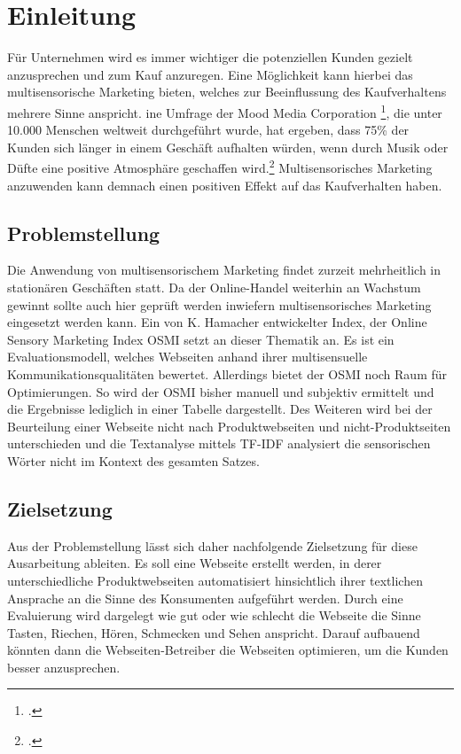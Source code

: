 \section{Einleitung}
Für Unternehmen wird es immer wichtiger die potenziellen Kunden gezielt anzusprechen und zum Kauf anzuregen. Eine Möglichkeit kann hierbei das multisensorische Marketing bieten, welches zur Beeinflussung des Kaufverhaltens mehrere Sinne anspricht.
ine Umfrage der Mood Media Corporation \footcite[\vglf][]{steiner2022}, die unter 10.000 Menschen weltweit durchgeführt wurde, hat ergeben, dass 75\% der Kunden sich länger in einem Geschäft aufhalten würden, wenn durch Musik oder Düfte eine positive Atmosphäre geschaffen wird.\footcite[\vglf][]{moodmedia2019}
Multisensorisches Marketing anzuwenden kann demnach einen positiven Effekt auf das Kaufverhalten haben.

\subsection{Problemstellung}
Die Anwendung von multisensorischem Marketing findet zurzeit mehrheitlich in stationären Geschäften statt. Da der Online-Handel weiterhin an Wachstum gewinnt sollte auch hier geprüft werden inwiefern multisensorisches Marketing eingesetzt werden kann.
Ein von K. Hamacher entwickelter Index, der Online Sensory Marketing Index \acl{OSMI} setzt an dieser Thematik an. Es ist ein Evaluationsmodell, welches Webseiten anhand ihrer
multisensuelle Kommunikationsqualitäten bewertet. Allerdings bietet der \acl{OSMI} noch Raum für Optimierungen. So wird der \acl{OSMI} bisher manuell und subjektiv ermittelt und die Ergebnisse lediglich in einer Tabelle dargestellt.
Des Weiteren wird bei der Beurteilung einer Webseite nicht nach Produktwebseiten und nicht-Produktseiten unterschieden und die Textanalyse mittels TF-IDF analysiert die sensorischen Wörter nicht im Kontext des gesamten Satzes.

\subsection{Zielsetzung}
Aus der Problemstellung lässt sich daher nachfolgende Zielsetzung für diese Ausarbeitung ableiten. Es soll eine Webseite erstellt werden, in derer unterschiedliche Produktwebseiten automatisiert hinsichtlich ihrer textlichen Ansprache an die Sinne des Konsumenten aufgeführt werden.
Durch eine Evaluierung wird dargelegt wie gut oder wie schlecht die Webseite die Sinne Tasten, Riechen, Hören, Schmecken und Sehen anspricht.
Darauf aufbauend könnten dann die Webseiten-Betreiber die Webseiten optimieren, um die Kunden besser anzusprechen.

